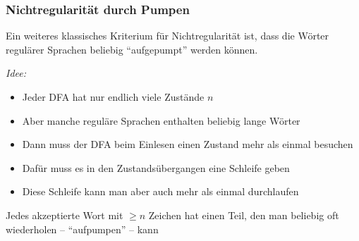 \documentclass[aspectratio=1610,onlymath]{beamer}
\begin{document}
% 
% 

\newcommand{\colstackrel}[3]{\,{\stackrel{\textcolor{#3}{#1}}{\textcolor{#3}{#2}}}\,}
\newcommand{\gstackrel}[2]{\colstackrel{#1}{#2}{darkgreen}}
\newcommand{\bstackrel}[2]{\colstackrel{#1}{#2}{darkblue}}
\newcommand{\rstackrel}[2]{\colstackrel{#1}{#2}{darkred}}

\begin{frame}\frametitle{Nichtregularität durch Pumpen}

Ein weiteres klassisches Kriterium für Nichtregularität ist, dass die Wörter regulärer Sprachen
beliebig "`aufgepumpt"' werden können.
\bigskip

\emph{Idee:}
\begin{itemize}
\item Jeder DFA hat nur endlich viele Zustände $n$
\item Aber manche reguläre Sprachen enthalten beliebig lange Wörter
\end{itemize}
\pause
% 
\begin{itemize}
\item Dann muss der DFA beim Einlesen einen Zustand mehr als einmal besuchen
\item Dafür muss es in den Zustandsübergangen eine Schleife geben
\item Diese Schleife kann man aber auch mehr als einmal durchlaufen
% 
\end{itemize}\pause

\begin{center}
\alert{Jedes akzeptierte Wort mit $\geq n$ Zeichen hat einen Teil, den man beliebig oft wiederholen -- "`aufpumpen"' -- kann}
\end{center}

\end{frame}
\end{document}
